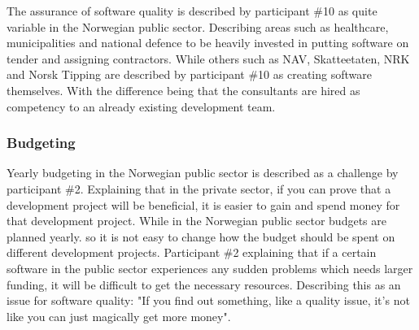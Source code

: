 
The assurance of software quality is described by participant \#10 as quite variable in the Norwegian public sector. Describing areas such as healthcare, municipalities and national defence to be heavily invested in putting software on tender and assigning contractors. While others such as NAV, Skatteetaten, NRK and Norsk Tipping are described by participant \#10 as creating software themselves. With the difference being that the consultants are hired as competency to an already existing development team.


\subsubsection{Budgeting}
Yearly budgeting in the Norwegian public sector is described as a challenge by participant \#2. Explaining that in the private sector, if you can prove that a development project will be beneficial, it is easier to gain and spend money for that development project. While in the Norwegian public sector budgets are planned yearly. so it is not easy to change how the budget should be spent on different development projects. Participant \#2 explaining that if a certain software in the public sector experiences any sudden problems which needs larger funding, it will be difficult to get the necessary resources. Describing this as an issue for software quality: "If you find out something, like a quality issue, it's not like you can just magically get more money".

